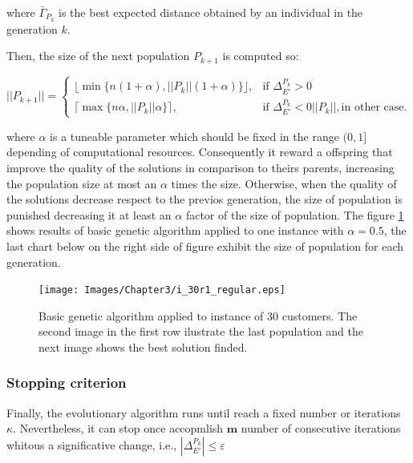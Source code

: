 where $\bar{\Gamma}_{P_k}$ is the best expected distance obtained by an individual in the generation $k$.

Then, the size of the next population $P_{k+1}$ is computed so:

\begin{equation}\label{eq:population_size}
 ||P_{k+1}|| = \left \{ \begin{array}{ll}
  \lfloor  \min\{n(1+\alpha), ||P_{k}||(1+\alpha)\} \rfloor, & \text{if } \Delta^{P_k}_{E'} > 0\\
  \lceil \max\{n\alpha, ||P_{k}||\alpha\} \rceil, & \text{if } \Delta^{P_k}_{E'} < 0
  ||P_{k}||, \text{in other case.}
  \end{array} \right.
\end{equation}


where $\alpha$ is a tuneable parameter which should be fixed in the range $(0,1]$ depending of computational resources. Consequently it reward a offspring that improve the quality of the solutions in comparison to theirs parents, increasing the population size at most an $\alpha$ times the size. Otherwise, when the quality of the solutions decrease respect to the previos generation, the size of population is punished decreasing it at least an $\alpha$ factor of the size of population. The figure \ref{fig:ga_basic_i_30r1} shows results of basic genetic algorithm applied to one instance with $\alpha = 0.5$, the last chart below on the right side of figure exhibit the size of population for each generation.

\begin{figure}[!htbp]
  \begin{center}
   \texttt{[image: Images/Chapter3/i\_30r1\_regular.eps]}
  \end{center}
    \caption{Basic genetic algorithm applied to instance of 30 customers. The second image in the first row ilustrate the last population and the next image shows the best solution finded. }\label{fig:ga_basic_i_30r1}
\end{figure}

\subsubsection*{Stopping criterion}

Finally, the evolutionary algorithm runs until reach a fixed number or iterations $\kappa$. Nevertheless, it can stop once accopmlish $\mathbf{m}$ number of consecutive iterations whitous a significative change, i.e., $|\Delta^{P_k}_{E'}|\leq \varepsilon$

